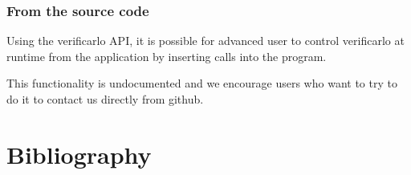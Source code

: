 \documentclass{TP}
\begin{document}
\subsubsection{From the source code}

Using the verificarlo API, it is possible for advanced user to control verificarlo at runtime from the application by inserting calls into the program.

This functionality is undocumented and we encourage users who want to try to do it to contact us directly from github.









\newpage

\section{Bibliography}

\end{document}
